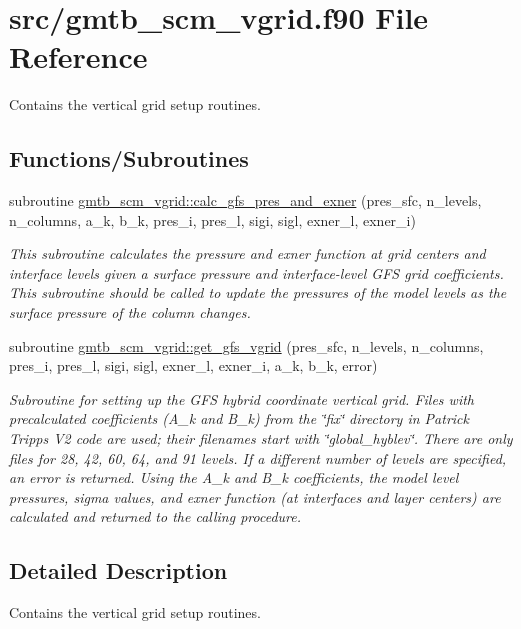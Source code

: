 \hypertarget{gmtb__scm__vgrid_8f90}{}\section{src/gmtb\+\_\+scm\+\_\+vgrid.f90 File Reference}
\label{gmtb__scm__vgrid_8f90}


Contains the vertical grid setup routines.  


\subsection*{Functions/\+Subroutines}
\begin{DoxyCompactItemize}
\item 
subroutine \hyperlink{group__vgrid_ga20af2c87714fbaa962ec9be7fae493d2}{gmtb\+\_\+scm\+\_\+vgrid\+::calc\+\_\+gfs\+\_\+pres\+\_\+and\+\_\+exner} (pres\+\_\+sfc, n\+\_\+levels, n\+\_\+columns, a\+\_\+k, b\+\_\+k, pres\+\_\+i, pres\+\_\+l, sigi, sigl, exner\+\_\+l, exner\+\_\+i)
\begin{DoxyCompactList}\small\item\em This subroutine calculates the pressure and exner function at grid centers and interface levels given a surface pressure and interface-\/level G\+FS grid coefficients. This subroutine should be called to update the pressures of the model levels as the surface pressure of the column changes. \end{DoxyCompactList}\end{DoxyCompactItemize}
{\bf }\par
\begin{DoxyCompactItemize}
\item 
subroutine \hyperlink{group__vgrid_ga1086e1f828a0bafa38299bdc17fde6fe}{gmtb\+\_\+scm\+\_\+vgrid\+::get\+\_\+gfs\+\_\+vgrid} (pres\+\_\+sfc, n\+\_\+levels, n\+\_\+columns, pres\+\_\+i, pres\+\_\+l, sigi, sigl, exner\+\_\+l, exner\+\_\+i, a\+\_\+k, b\+\_\+k, error)
\begin{DoxyCompactList}\small\item\em Subroutine for setting up the G\+FS hybrid coordinate vertical grid. Files with precalculated coefficients (A\+\_\+k and B\+\_\+k) from the \char`\"{}fix\char`\"{} directory in Patrick Tripp\textquotesingle{}s V2 code are used; their filenames start with \char`\"{}global\+\_\+hyblev\char`\"{}. There are only files for 28, 42, 60, 64, and 91 levels. If a different number of levels are specified, an error is returned. Using the A\+\_\+k and B\+\_\+k coefficients, the model level pressures, sigma values, and exner function (at interfaces and layer centers) are calculated and returned to the calling procedure. \end{DoxyCompactList}\end{DoxyCompactItemize}



\subsection{Detailed Description}
Contains the vertical grid setup routines. 

